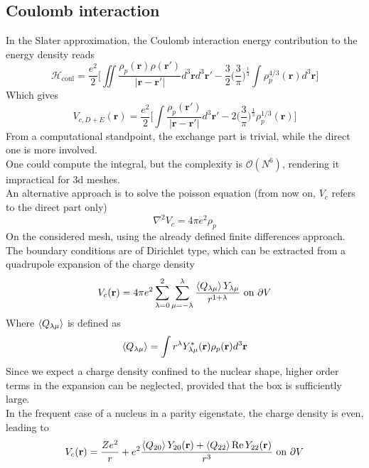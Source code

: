 \newpage
\subsection{Coulomb interaction}
In the Slater approximation, the Coulomb interaction energy contribution to the energy density reads
\begin{equation}
    \mathcal H_\text{coul} = \frac{e^2}{2}\bigg[\iint  \frac{\rho_p(\mathbf r )\rho(\mathbf r ' )}{|\mathbf r-\mathbf r'|}d^3\mathbf r d^3\mathbf r' - \frac 3 2 \bigg(\frac 3 \pi \bigg) ^{\frac 1 3}\int \rho_p^{4/3}(\mathbf r)d^3\mathbf r\bigg]
\end{equation}
Which gives
\begin{equation}
    V_{c, D+E}(\mathbf r) = \frac{e^2}{2}\bigg[\int \frac{\rho_p(\mathbf r ')}{|\mathbf r-\mathbf r'|} d^3 \mathbf r' - 2\bigg(\frac 3 \pi \bigg) ^{\frac 1 3} \rho_p^{1/3}(\mathbf r ) \bigg]
\end{equation}
From a computational standpoint, the exchange part is trivial, while the direct one is more involved.
\\One could compute the integral, but the complexity is $\mathcal O(N^6)$, rendering it impractical for 3d meshes.
\\An alternative approach is to solve the poisson equation (from now on, $V_c$ refers to the direct part only)
\begin{equation}
    \nabla^2 V_c = 4\pi e^2 \rho_p
\end{equation}
On the considered mesh, using the already defined finite differences approach.
\\The boundary conditions are of Dirichlet type, which can be extracted from a quadrupole expansion of the charge density
\begin{equation}
V_c (\mathbf r) = 4\pi e^2 \sum_{\lambda=0}^2\sum_{\mu=-\lambda}^\lambda \frac{\expval{Q_{\lambda\mu}} Y_{\lambda\mu}}{r^{1+\lambda}}\text{ on }\partial V
\end{equation}
Where $\expval{Q_{\lambda\mu}}$ is defined as 
\begin{equation}
    \expval{Q_{\lambda\mu}} = \int r^\lambda Y_{\lambda\mu}^* (\mathbf r)\rho_p(\mathbf r ) d^3 \mathbf r
\end{equation}
Since we expect a charge density confined to the nuclear shape, higher order terms in the expansion can be neglected, provided that the box is sufficiently large.
\\In the frequent case of a nucleus in a parity eigenstate, the charge density is even, leading to 
\begin{equation}
    V_{c}(\mathbf r ) = \frac{Ze^2}{r} + e^2\frac{\expval{Q_{20}} Y_{20}(\mathbf r) + \expval{Q_{22}}\Re Y_{22}(\mathbf r)}{{r}^3} \text{ on } \partial V
\end{equation}

